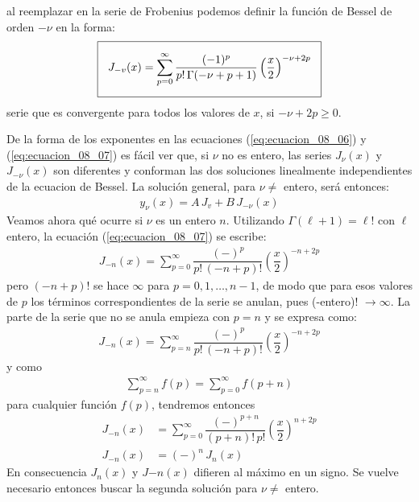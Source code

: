 al reemplazar en la serie de Frobenius podemos definir la función de Bessel de orden $-\nu$ en la forma:
\begin{align}
\setlength{\fboxsep}{3\fboxsep}\boxed{
J_{-v} (x) = \sum_{p=0}^{\infty} \dfrac{(-1)^{p}}{p! \, \Gamma (-\nu + p + 1)} \left( \dfrac{x}{2} \right)^{-\nu+2p}}
\label{eq:ecuacion_08_07}
\end{align}
serie que es convergente para todos los valores de $x$, si $-\nu + 2p \geq 0$.
\par
De la forma de los exponentes en las ecuaciones (\ref{eq:ecuacion_08_06}) y (\ref{eq:ecuacion_08_07}) es fácil ver que, si $\nu$ no es entero, las series $J_{\nu}(x)$ y $J_{-\nu}(x)$ son diferentes y conforman las dos soluciones linealmente independientes de la ecuacion de Bessel. La solución general, para $\nu \neq$ entero, será entonces:
\begin{align*}
y_{\nu}(x) = A \, J_{v} + B \, J_{-\nu} (x)
\end{align*}
Veamos ahora qué ocurre si $\nu$ es un entero $n$. Utilizando $\Gamma (\ell + 1) = \ell !$ con $\ell$ entero, la ecuación (\ref{eq:ecuacion_08_07}) se escribe:
\begin{align*}
J_{-n} (x) = \sum_{p=0}^{\infty} \dfrac{(-)^{p}}{p! \, (-n + p)!} \left( \dfrac{x}{2} \right)^{-n+2p}
\end{align*}
pero $(-n + p)!$ se hace $\infty$ para $p = 0, 1, \ldots, n-1$, de modo que para esos valores de $p$ los términos correspondientes de la serie se anulan, pues (-entero)! $\to \infty$. La parte de la serie que no se anula empieza con $p = n$ y se expresa como:
\begin{align*}
J_{-n} (x) = \sum_{p=n}^{\infty} \dfrac{(-)^{p}}{p! \, (-n + p)!} \left( \dfrac{x}{2} \right)^{-n+2p}
\end{align*}
y como 
\begin{align*}
\sum_{p=n}^{\infty} f(p) = \sum_{p=0}^{\infty} f(p + n)
\end{align*}
para cualquier función $f(p)$, tendremos entonces
\begin{align*}
J_{-n} (x) &= \sum_{p=0}^{\infty} \dfrac{(-)^{p+n}}{(p + n)! \, p!} \left( \dfrac{x}{2} \right)^{n+2p} \\[0.5em]
J_{-n} (x) &= (-)^{n} \, J_{n}(x)
\end{align*}
En consecuencia $J_{n}(x)$ y $J{-n}(x)$ difieren al máximo en un signo. Se vuelve necesario entonces buscar la segunda solución para $\nu \neq$ entero.
